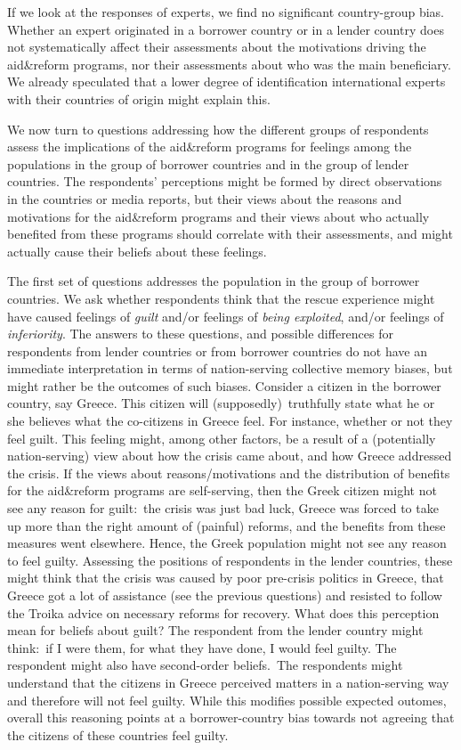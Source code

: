 If we look at the responses of experts, we find no significant country-group
bias. Whether an expert originated in a borrower country or in a lender
country does not systematically affect their assessments about the
motivations driving the aid\&reform programs, nor their assessments about
who was the main beneficiary. We already speculated that a lower degree of
identification international experts with their countries of origin might
explain this.

We now turn to questions addressing how the different groups of respondents
assess the implications of the aid\&reform programs for feelings among the
populations in the group of borrower countries and in the group of lender
countries. The respondents' perceptions might be formed by direct
observations in the countries or media reports, but their views about the
reasons and motivations for the aid\&reform programs and their views about
who actually benefited from these programs should correlate with their
assessments, and might actually cause their beliefs about these feelings. 

The first set of questions addresses the population in the group of borrower
countries. We ask whether respondents think that the rescue experience might
have caused feelings of \textit{guilt} and/or feelings of \textit{being
exploited}, and/or feelings of \textit{inferiority}. The answers to these
questions, and possible differences for respondents from lender countries or
from borrower countries do not have an immediate interpretation in terms of
nation-serving collective memory biases, but might rather be the outcomes of
such biases. Consider a citizen in the borrower country, say Greece. This
citizen will (supposedly)\ truthfully state what he or she believes what the
co-citizens in Greece feel. For instance, whether or not they feel guilt.
This feeling might, among other factors, be a result of a (potentially
nation-serving) view about how the crisis came about, and how Greece
addressed the crisis. If the views about reasons/motivations and the
distribution of benefits for the aid\&reform programs are self-serving, then
the Greek citizen might not see any reason for guilt:\ the crisis was just
bad luck, Greece was forced to take up more than the right amount of
(painful) reforms, and the benefits from these measures went elsewhere.
Hence, the Greek population might not see any reason to feel guilty.
Assessing the positions of respondents in the lender countries, these might
think that the crisis was caused by poor pre-crisis politics in Greece, that
Greece got a lot of assistance (see the previous questions) and resisted to
follow the Troika advice on necessary reforms for recovery. What does this
perception mean for beliefs about guilt? The respondent from the lender
country might think:\ if I were them, for what they have done, I would feel
guilty. The respondent might also have second-order beliefs.\ The respondents
might understand that the citizens in Greece perceived matters in a
nation-serving way and therefore will not feel guilty. While this modifies
possible expected outomes, overall this reasoning points at a
borrower-country bias towards not agreeing that the citizens of these
countries feel guilty. 

